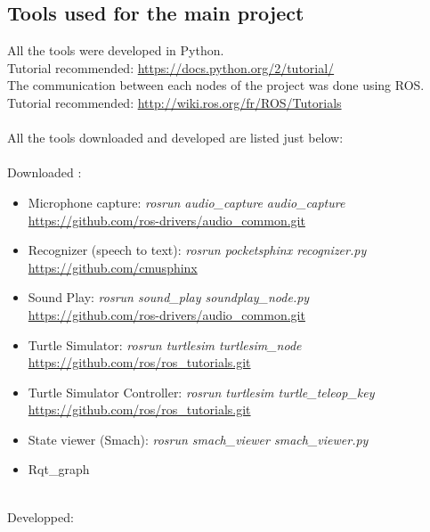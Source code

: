 \subsection{Tools used for the main project}
All the tools were developed in Python.\\
Tutorial recommended: \url{https://docs.python.org/2/tutorial/}\\
The communication between each nodes of the project was done using ROS. \\
Tutorial recommended: \url{http://wiki.ros.org/fr/ROS/Tutorials}\\
\\
All the tools downloaded and developed are listed just below:\\
\\Downloaded :
\begin{itemize}
  \item Microphone capture: \textit{rosrun audio\_capture audio\_capture} \\ 
  \url{https://github.com/ros-drivers/audio\_common.git}
  \item Recognizer (speech to text): \textit{rosrun pocketsphinx recognizer.py} \\
  \url{https://github.com/cmusphinx}
  \item Sound Play: \textit{rosrun sound\_play soundplay\_node.py} \\
  \url{https://github.com/ros-drivers/audio\_common.git}
  \item Turtle Simulator: \textit{rosrun turtlesim turtlesim\_node} \\ 
  \url{https://github.com/ros/ros\_tutorials.git}
  \item Turtle Simulator Controller: \textit{rosrun turtlesim turtle\_teleop\_key} \\ 
  \url{https://github.com/ros/ros\_tutorials.git}
  \item State viewer (Smach): \textit{rosrun smach\_viewer smach\_viewer.py} 
  \item Rqt\_graph 
\end{itemize}
\hfill \\
Developped:
